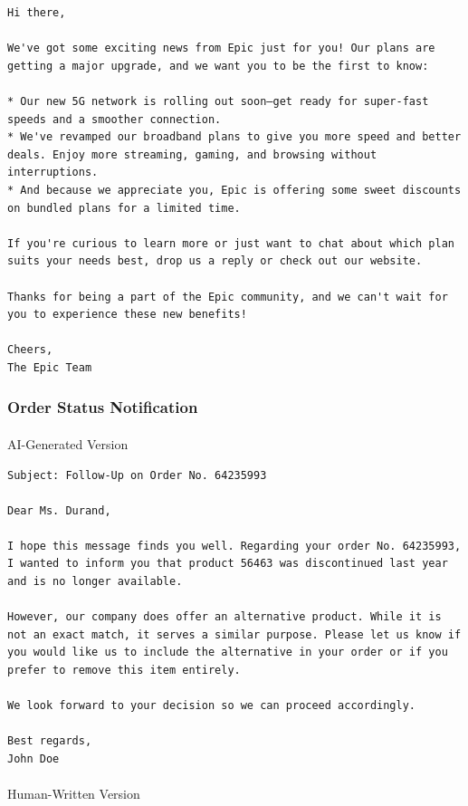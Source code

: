 \documentclass[
  letterpaper,
  DIV=11,
  numbers=noendperiod]{scrartcl}
\makeatletter
\let\oldparagraph\paragraph
\renewcommand{\paragraph}{
    \@ifstar
      \xxxParagraphStar
      \xxxParagraphNoStar
  }
\newcommand{\xxxParagraphStar}[1]{\oldparagraph*{#1}\mbox{}}
\newcommand{\xxxParagraphNoStar}[1]{\oldparagraph{#1}\mbox{}}
\makeatother
\begin{document}
\begin{verbatim}
Hi there,

We've got some exciting news from Epic just for you! Our plans are getting a major upgrade, and we want you to be the first to know:

* Our new 5G network is rolling out soon—get ready for super-fast speeds and a smoother connection.
* We've revamped our broadband plans to give you more speed and better deals. Enjoy more streaming, gaming, and browsing without interruptions.
* And because we appreciate you, Epic is offering some sweet discounts on bundled plans for a limited time.

If you're curious to learn more or just want to chat about which plan suits your needs best, drop us a reply or check out our website.

Thanks for being a part of the Epic community, and we can't wait for you to experience these new benefits!

Cheers,
The Epic Team
\end{verbatim}

\subsubsection{Order Status
Notification}\label{order-status-notification}

\paragraph{AI-Generated Version}\label{ai-generated-version-1}

\begin{verbatim}
Subject: Follow-Up on Order No. 64235993

Dear Ms. Durand,

I hope this message finds you well. Regarding your order No. 64235993, I wanted to inform you that product 56463 was discontinued last year and is no longer available.

However, our company does offer an alternative product. While it is not an exact match, it serves a similar purpose. Please let us know if you would like us to include the alternative in your order or if you prefer to remove this item entirely.

We look forward to your decision so we can proceed accordingly.

Best regards,
John Doe
\end{verbatim}

\paragraph{Human-Written Version}\label{human-written-version-1}
\end{document}
